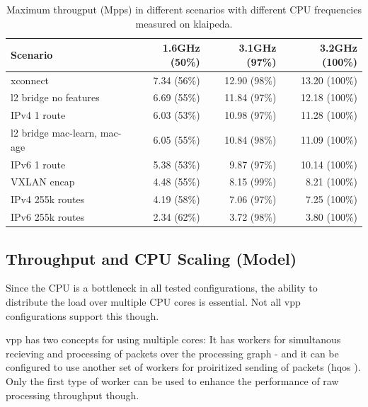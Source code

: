 

\begin{table}[!ht]
	\vspace{5ex}
	\begin{tabular}[]{ l r r r }
		Scenario & 1.6GHz (50\%) & 3.1GHz (97\%)  & 3.2GHz (100\%) \\ 
		\midrule
		xconnect & 7.34 (56\%) & 12.90 (98\%) & 13.20 (100\%) \\ %
		l2 bridge no features & 6.69 (55\%) & 11.84 (97\%) & 12.18 (100\%) \\ %
		IPv4 1 route & 6.03 (53\%) & 10.98 (97\%) & 11.28 (100\%) \\ %
		l2 bridge mac-learn, mac-age & 6.05 (55\%) & 10.84 (98\%) & 11.09 (100\%) \\ %
		IPv6 1 route & 5.38 (53\%) & 9.87 (97\%) & 10.14 (100\%) \\ %
		VXLAN encap & 4.48 (55\%) & 8.15 (99\%) & 8.21 (100\%) \\ %
		IPv4 255k routes & 4.19 (58\%) & 7.06 (97\%) & 7.25 (100\%) \\ %
		IPv6 255k routes & 2.34 (62\%) & 3.72 (98\%) & 3.80 (100\%) \\ %
		\midrule
	\end{tabular}
	\caption{Maximum througput (Mpps) in different scenarios with different CPU frequencies measured on klaipeda. }
	\label{bottleneck}
\end{table}


\subsection{Throughput and CPU Scaling (Model)}

Since the CPU is a bottleneck in all tested configurations, the
ability to distribute the load over multiple CPU cores is
essential. Not all \Ac{vpp} configurations support this though.

\Ac{vpp} has two concepts for using multiple cores: It has workers for
simultanous recieving and processing of packets over the processing
graph - and it can be configured to use another set of workers for
proiritized sending of packets (\Ac{hqos} \cite{vppdocs:qos}
\cite{vppdocs:hqosplacement}). Only the first type of worker can be
used to enhance the performance of raw processing throughput though.

